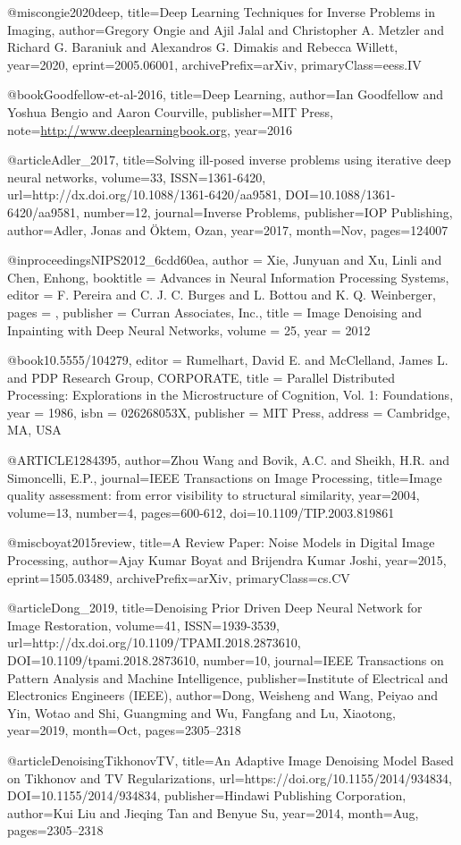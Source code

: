 @misc{ongie2020deep,
      title={Deep Learning Techniques for Inverse Problems in Imaging}, 
      author={Gregory Ongie and Ajil Jalal and Christopher A. Metzler and Richard G. Baraniuk and Alexandros G. Dimakis and Rebecca Willett},
      year={2020},
      eprint={2005.06001},
      archivePrefix={arXiv},
      primaryClass={eess.IV}
}

@book{Goodfellow-et-al-2016,
    title={Deep Learning},
    author={Ian Goodfellow and Yoshua Bengio and Aaron Courville},
    publisher={MIT Press},
    note={\url{http://www.deeplearningbook.org}},
    year={2016}
}

@article{Adler_2017,
	title={Solving ill-posed inverse problems using iterative deep neural networks},
	volume={33},
	ISSN={1361-6420},
	url={http://dx.doi.org/10.1088/1361-6420/aa9581},
	DOI={10.1088/1361-6420/aa9581},
	number={12},
	journal={Inverse Problems},
	publisher={IOP Publishing},
	author={Adler, Jonas and Öktem, Ozan},
	year={2017},
	month={Nov},
	pages={124007}
}

@inproceedings{NIPS2012_6cdd60ea,
	author = {Xie, Junyuan and Xu, Linli and Chen, Enhong},
	booktitle = {Advances in Neural Information Processing Systems},
	editor = {F. Pereira and C. J. C. Burges and L. Bottou and K. Q. Weinberger},
	pages = {},
	publisher = {Curran Associates, Inc.},
	title = {Image Denoising and Inpainting with Deep Neural Networks},
	volume = {25},
	year = {2012}
}

@book{10.5555/104279,
	editor = {Rumelhart, David E. and McClelland, James L. and PDP Research Group, CORPORATE},
	title = {Parallel Distributed Processing: Explorations in the Microstructure of Cognition, Vol. 1: Foundations},
	year = {1986},
	isbn = {026268053X},
	publisher = {MIT Press},
	address = {Cambridge, MA, USA}
}

@ARTICLE{1284395,
	author={Zhou Wang and Bovik, A.C. and Sheikh, H.R. and Simoncelli, E.P.},
	journal={IEEE Transactions on Image Processing}, 
	title={Image quality assessment: from error visibility to structural similarity}, 
	year={2004},
	volume={13},
	number={4},
	pages={600-612},
	doi={10.1109/TIP.2003.819861}}

@misc{boyat2015review,
	title={A Review Paper: Noise Models in Digital Image Processing}, 
	author={Ajay Kumar Boyat and Brijendra Kumar Joshi},
	year={2015},
	eprint={1505.03489},
	archivePrefix={arXiv},
	primaryClass={cs.CV}
}

@article{Dong_2019,
	title={Denoising Prior Driven Deep Neural Network for Image Restoration},
	volume={41},
	ISSN={1939-3539},
	url={http://dx.doi.org/10.1109/TPAMI.2018.2873610},
	DOI={10.1109/tpami.2018.2873610},
	number={10},
	journal={IEEE Transactions on Pattern Analysis and Machine Intelligence},
	publisher={Institute of Electrical and Electronics Engineers (IEEE)},
	author={Dong, Weisheng and Wang, Peiyao and Yin, Wotao and Shi, Guangming and Wu, Fangfang and Lu, Xiaotong},
	year={2019},
	month={Oct},
	pages={2305–2318}
}

@article{DenoisingTikhonovTV,
	title={An Adaptive Image Denoising Model Based on Tikhonov and TV Regularizations},
	url={https://doi.org/10.1155/2014/934834},
	DOI={10.1155/2014/934834},
	publisher={Hindawi Publishing Corporation},
	author={Kui Liu and Jieqing Tan and Benyue Su},
	year={2014},
	month={Aug},
	pages={2305–2318}
}
